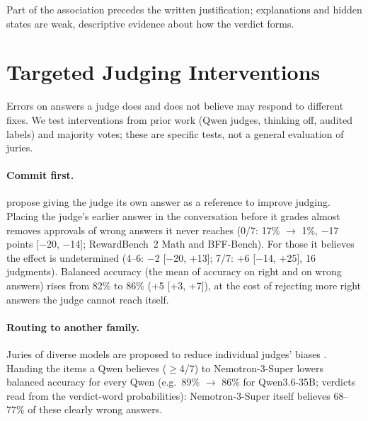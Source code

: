 \documentclass[11pt]{article}
\newcounter{takeaway}
\begin{document}
\begin{takeaway}
Part of the association precedes the written justification; explanations and hidden states are weak, descriptive
evidence about how the verdict forms.
\end{takeaway}

\section{Targeted Judging Interventions}
\label{sec:juries}

Errors on answers a judge does and does not believe may respond to different fixes. We test interventions from
prior work (Qwen judges, thinking off, audited labels) and majority votes; these are specific tests, not a general
evaluation of juries.

\paragraph{Commit first.}
\citet{lin-etal-2025-before} propose giving the judge its own answer as a reference to improve judging. Placing
the judge's earlier answer in the conversation before it grades almost removes approvals of wrong answers it never
reaches (0/7: 17\% $\rightarrow$ 1\%, $-$17 points [$-$20, $-$14]; RewardBench~2 Math and BFF-Bench). For those it
believes the effect is undetermined (4--6: $-$2 [$-$20, +13]; 7/7: +6 [$-$14, +25], 16 judgments). Balanced
accuracy (the mean of accuracy on right and on wrong answers) rises from 82\% to 86\% (+5 [+3, +7]), at the cost of
rejecting more right answers the judge cannot reach itself.

\paragraph{Routing to another family.}
Juries of diverse models are proposed to reduce individual judges' biases \citep{verga2024replacing}. Handing the
items a Qwen believes ($\geq$4/7) to Nemotron-3-Super lowers balanced accuracy for every Qwen (e.g.\ 89\%
$\rightarrow$ 86\% for Qwen3.6-35B; verdicts read from the verdict-word probabilities): Nemotron-3-Super itself
believes 68--77\% of these clearly wrong answers.
\end{document}
